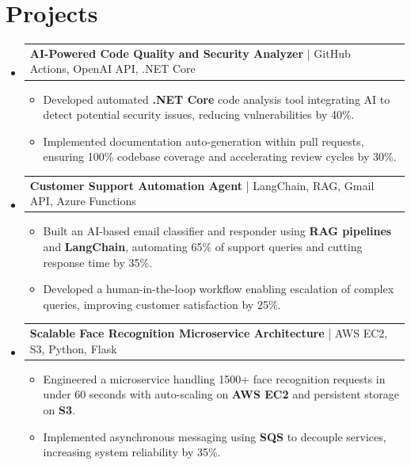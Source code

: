 \documentclass[letterpaper,11pt]{article}
\makeatletter
\newcommand{\resumeItem}[1]{
  \item\footnotesize{
    {#1 \vspace{-2pt}}
  }
}
\newcommand{\resumeProjectHeading}[2]{
    \item
    \begin{tabular*}{1.001\textwidth}{l@{\extracolsep{\fill}}r}
      \small#1 & \textbf{\small #2}\\
    \end{tabular*}\vspace{-7pt}
}
\newcommand{\resumeSubHeadingListStart}{\begin{itemize}[leftmargin=0pt, label={}]}
\newcommand{\resumeSubHeadingListEnd}{\end{itemize}}
\newcommand{\resumeItemListStart}{\begin{itemize}[leftmargin=*]}
\newcommand{\resumeItemListEnd}{\end{itemize}\vspace{-5pt}}
\makeatother
\begin{document}
\section{Projects}
    \vspace{-5pt}
    \resumeSubHeadingListStart
          \resumeProjectHeading
              {\textbf{AI-Powered Code Quality and Security Analyzer} | GitHub Actions, OpenAI API, .NET Core}{}
        \resumeItemListStart
            \resumeItem{Developed automated \textbf{.NET Core} code analysis tool integrating AI to detect potential security issues, reducing vulnerabilities by 40\%.}
            \resumeItem{Implemented documentation auto-generation within pull requests, ensuring 100\% codebase coverage and accelerating review cycles by 30\%.}
        \resumeItemListEnd
        \vspace{-12pt}
    
    \resumeProjectHeading
        {\textbf{Customer Support Automation Agent} | LangChain, RAG, Gmail API, Azure Functions}{}
        \resumeItemListStart
            \resumeItem{Built an AI-based email classifier and responder using \textbf{RAG pipelines} and \textbf{LangChain}, automating 65\% of support queries and cutting response time by 35\%.}
            \resumeItem{Developed a human-in-the-loop workflow enabling escalation of complex queries, improving customer satisfaction by 25\%.}
        \resumeItemListEnd
          \vspace{-12pt}
      \resumeProjectHeading
          {\textbf{Scalable Face Recognition Microservice Architecture} | AWS EC2, S3, Python, Flask}{}
          \resumeItemListStart
              \resumeItem{Engineered a microservice handling 1500+ face recognition requests in under 60 seconds with auto-scaling on \textbf{AWS EC2} and persistent storage on \textbf{S3}.}
              \resumeItem{Implemented asynchronous messaging using \textbf{SQS} to decouple services, increasing system reliability by 35\%.}
          \resumeItemListEnd 
    \resumeSubHeadingListEnd
\end{document}
